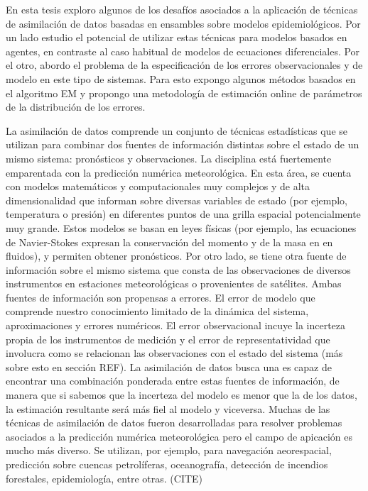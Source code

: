 En esta tesis exploro algunos de los desafíos asociados a la aplicación de técnicas de asimilación de datos basadas en ensambles sobre modelos epidemiológicos. Por un lado estudio el potencial de utilizar estas técnicas para modelos basados en agentes, en contraste al caso habitual de modelos de ecuaciones diferenciales. Por el otro, abordo el problema de la especificación de los errores observacionales y de modelo en este tipo de sistemas. Para esto expongo algunos métodos basados en el algoritmo EM y propongo una metodología de estimación online de parámetros de la distribución de los errores.



La asimilación de datos comprende un conjunto de técnicas estadísticas que se utilizan para combinar dos fuentes de información distintas sobre el estado de un mismo sistema: pronósticos y observaciones. La disciplina está fuertemente emparentada con la predicción numérica meteorológica. En esta área, se cuenta con modelos matemáticos y computacionales muy complejos y de alta dimensionalidad que informan sobre diversas variables de estado (por ejemplo, temperatura o presión) en diferentes puntos de una grilla espacial potencialmente muy grande. Estos modelos se basan en leyes físicas (por ejemplo, las ecuaciones de Navier-Stokes expresan la conservación del momento y de la masa en en fluidos), y permiten obtener pronósticos. Por otro lado, se tiene otra fuente de información sobre el mismo sistema que consta de las observaciones de diversos instrumentos en estaciones meteorológicas o provenientes de satélites. Ambas fuentes de información son propensas a errores. El error de modelo que comprende nuestro conocimiento limitado de la dinámica del sistema, aproximaciones y errores numéricos. El error observacional incuye la incerteza propia de los instrumentos de medición y el error de representatividad que involucra como se relacionan las observaciones con el estado del sistema (más sobre esto en sección REF). La asimilación de datos busca una es capaz de encontrar una combinación ponderada entre estas fuentes de información, de manera que si sabemos que la incerteza del modelo es menor que la de los datos, la estimación resultante será más fiel al modelo y viceversa. Muchas de las técnicas de asimilación de datos fueron desarrolladas para resolver problemas asociados a la predicción numérica meteorológica pero el campo de apicación es mucho más diverso. Se utilizan, por ejemplo, para navegación aeorespacial, predicción sobre cuencas petrolíferas, oceanografía, detección de incendios forestales, epidemiología, entre otras. (CITE)

